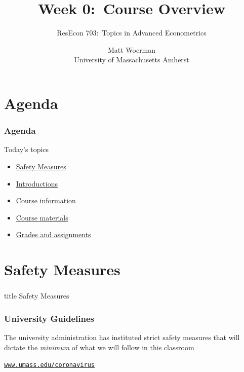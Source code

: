 \documentclass{beamer}
\title[Week 0:\ Course Overview]{Week 0:\ Course Overview}
\author[ResEcon 703:\ Advanced Econometrics]{ResEcon 703:\ Topics in Advanced Econometrics}
\date{Matt Woerman\\University of Massachusetts Amherst}
\begin{document}
{ 
\begin{frame}[noframenumbering]
    \titlepage
\end{frame}
}

\section{Agenda}
\begin{frame}\frametitle{Agenda}
    Today's topics
    \begin{itemize}
        \item \hyperlink{page.\getpagerefnumber{safety}}{Safety Measures}
    	\item \hyperlink{page.\getpagerefnumber{introductions}}{Introductions}
        \item \hyperlink{page.\getpagerefnumber{information}}{Course information}
        \item \hyperlink{page.\getpagerefnumber{materials}}{Course materials}
        \item \hyperlink{page.\getpagerefnumber{grades}}{Grades and assignments}
    \end{itemize}
\end{frame}

\section{Safety Measures}
\label{safety}
\begin{frame}\frametitle{}
    \vfill
    \centering
    \begin{beamercolorbox}[center]{title}
        \Large Safety Measures
    \end{beamercolorbox}
    \vfill
\end{frame}

\begin{frame}\frametitle{University Guidelines}
    The university administration has instituted strict safety measures that will dictate the \emph{minimum} of what we will follow in this classroom
    \vspace{3ex}
    \begin{center}
        \href{https://www.umass.edu/coronavirus/}{\texttt{www.umass.edu/coronavirus}}
    \end{center}
\end{frame}
\end{document}
